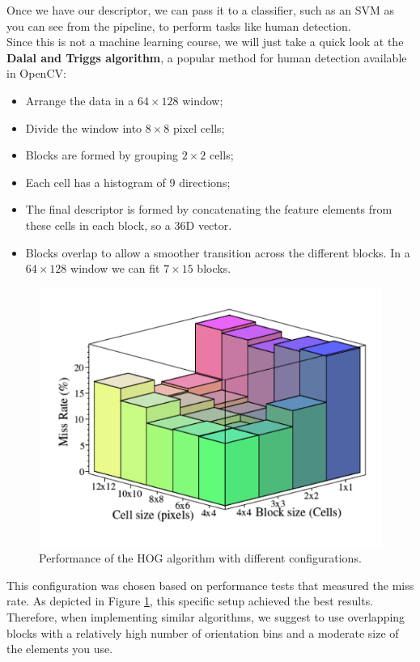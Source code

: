 Once we have our descriptor, we can pass it to a classifier, such as an SVM as you can see from the pipeline, to perform tasks like human detection. 
\\
Since this is not a machine learning course, we will just take a quick look at the \textbf{Dalal and Triggs algorithm}, a popular method for human detection available in OpenCV:

\begin{itemize}
    \item Arrange the data in a $64\times128$ window;
    \item Divide the window into $8\times8$ pixel cells;
    \item Blocks are formed by grouping $2\times2$ cells;
    \item Each cell has a histogram of 9 directions;
    \item The final descriptor is formed by concatenating the feature elements from these cells in each block, so a 36D vector.
    \item Blocks overlap to allow a smoother transition across the different blocks. In a $64\times128$ window we can fit $7\times15$ blocks.
\end{itemize}

\begin{figure}
    \includegraphics[scale=0.3]{Figures/Performance.png}
    \caption{Performance of the HOG algorithm with different configurations.}
    \label{fig:Performance}
\end{figure}
This configuration was chosen based on performance tests that measured the miss rate. As depicted in Figure \ref{fig:Performance}, this specific setup achieved the best results. Therefore, when implementing similar algorithms, we suggest to use overlapping blocks with a relatively high number of orientation bins and a moderate size of the elements you use.
